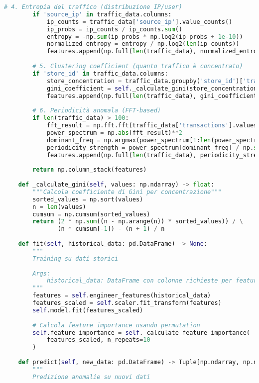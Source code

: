 \begin{lstlisting}[language=Python, caption=Isolation Forest per Anomaly Detection GDO]
        # 4. Entropia del traffico (distribuzione IP/user)
        if 'source_ip' in traffic_data.columns:
            ip_counts = traffic_data['source_ip'].value_counts()
            ip_probs = ip_counts / ip_counts.sum()
            entropy = -np.sum(ip_probs * np.log2(ip_probs + 1e-10))
            normalized_entropy = entropy / np.log2(len(ip_counts))
            features.append(np.full(len(traffic_data), normalized_entropy))
        
        # 5. Clustering coefficient (quanto traffico è concentrato)
        if 'store_id' in traffic_data.columns:
            store_concentration = traffic_data.groupby('store_id')['transactions'].sum()
            gini_coefficient = self._calculate_gini(store_concentration.values)
            features.append(np.full(len(traffic_data), gini_coefficient))
        
        # 6. Periodicità anomala (FFT-based)
        if len(traffic_data) > 100:
            fft_result = np.fft.fft(traffic_data['transactions'].values)
            power_spectrum = np.abs(fft_result)**2
            dominant_freq = np.argmax(power_spectrum[1:len(power_spectrum)//2]) + 1
            periodicity_strength = power_spectrum[dominant_freq] / np.sum(power_spectrum)
            features.append(np.full(len(traffic_data), periodicity_strength))
        
        return np.column_stack(features)
    
    def _calculate_gini(self, values: np.ndarray) -> float:
        """Calcola coefficiente di Gini per concentrazione"""
        sorted_values = np.sort(values)
        n = len(values)
        cumsum = np.cumsum(sorted_values)
        return (2 * np.sum((n - np.arange(n)) * sorted_values)) / \
               (n * cumsum[-1]) - (n + 1) / n
    
    def fit(self, historical_data: pd.DataFrame) -> None:
        """
        Training su dati storici
        
        Args:
            historical_data: DataFrame con colonne richieste per feature engineering
        """
        features = self.engineer_features(historical_data)
        features_scaled = self.scaler.fit_transform(features)
        self.model.fit(features_scaled)
        
        # Calcola feature importance usando permutation
        self.feature_importance = self._calculate_feature_importance(
            features_scaled, n_repeats=10
        )
    
    def predict(self, new_data: pd.DataFrame) -> Tuple[np.ndarray, np.ndarray]:
        """
        Predizione anomalie su nuovi dati
        

\end{lstlisting}
